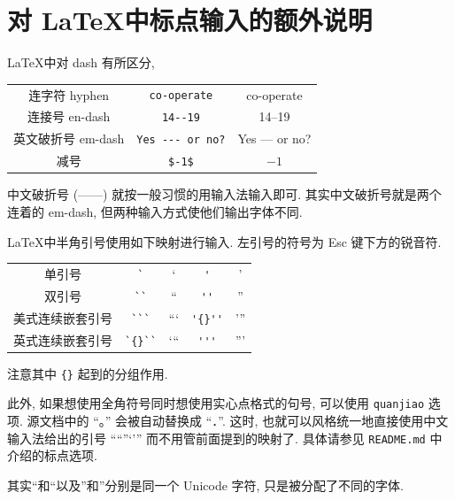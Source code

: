 \documentclass[notofandol]{mpltx}
\newcommand{\note}[1]{{\color{gray}#1}}
\begin{document}
\section{对 \LaTeX 中标点输入的额外说明}
\LaTeX 中对 dash 有所区分,
\begin{center}
    \begin{tabular}{c@{\quad}c@{\ $\rightarrow$\ }c}
        连字符 hyphen    & \verb|co-operate|     & co-operate \\
        连接号 en-dash   & \verb|14--19|         & 14--19 \\
        英文破折号 em-dash & \verb|Yes --- or no?| & Yes --- or no? \\
        减号            & \verb|$-1$|           & $-1$ \\
    \end{tabular}
\end{center}
中文破折号 (——) 就按一般习惯的用输入法输入即可.
\note{其实中文破折号就是两个连着的 em-dash, 但两种输入方式使他们输出字体不同.}

\LaTeX 中半角引号使用如下映射进行输入.
左引号的符号为 \textsf{Esc} 键下方的锐音符.
\begin{center}
    \begin{tabular}{c@{\quad}c@{\ $\rightarrow$\ }c@{\quad}c@{\ $\rightarrow$\ }c}
        单引号      & \verb|`|     & `     & \verb|'|     & ' \\
        双引号      & \verb|``|    & ``    & \verb|''|    & '' \\
        美式连续嵌套引号 & \verb|```|   & ```   & \verb|'{}''| & '{}'' \\
        英式连续嵌套引号 & \verb|`{}``| & `{}`` & \verb|'''|   & ''' \\
    \end{tabular}
\end{center}
注意其中 \texttt{\{\}} 起到的分组作用.

此外, 如果想使用全角符号同时想使用实心点格式的句号, 可以使用 \texttt{quanjiao} 选项.
源文档中的 ``。'' 会被自动替换成 ``．''.
这时, 也就可以风格统一地直接使用中文输入法给出的引号 ``“”‘’'' 而不用管前面提到的映射了.
具体请参见 \texttt{README.md} 中介绍的标点选项.

\note{其实“和``以及”和''分别是同一个 Unicode 字符, 只是被分配了不同的字体.}
\end{document}
